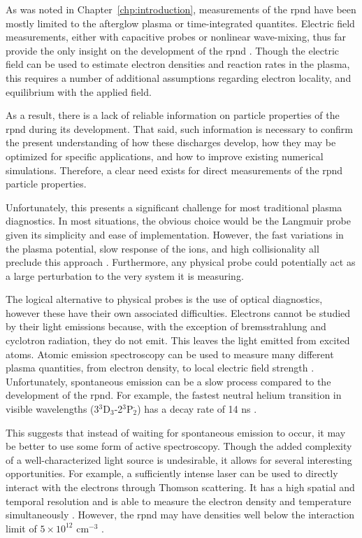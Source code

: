 As was noted in Chapter~\ref{chp:introduction}, measurements of the \acs{rpnd}
have been mostly limited to the afterglow plasma or time-integrated quantites.
Electric field measurements, either with capacitive probes or nonlinear
wave-mixing, thus far provide the only insight on the development of the
\acs{rpnd} \cite{Ito2010, Muller2011a, Takashima2011}. Though the electric field
can be used to estimate electron densities and reaction rates in the plasma,
this requires a number of additional assumptions regarding electron locality,
and equilibrium with the applied field.

As a result, there is a lack of reliable information on particle properties of
the \acs{rpnd} during its development. That said, such information is necessary
to confirm the present understanding of how these discharges develop, how they
may be optimized for specific applications, and how to improve existing
numerical simulations. Therefore, a clear need exists for direct measurements of
the \acs{rpnd} particle properties.

Unfortunately, this presents a significant challenge for most traditional plasma
diagnostics. In most situations, the obvious choice would be the Langmuir probe
given its simplicity and ease of implementation. However, the fast variations in
the plasma potential, slow response of the ions, and high collisionality all
preclude this approach \cite{Lieberman2005}. Furthermore, any physical probe
could potentially act as a large perturbation to the very system it is
measuring.

The logical alternative to physical probes is the use of optical diagnostics,
however these have their own associated difficulties. Electrons cannot be
studied by their light emissions because, with the exception of bremsstrahlung
and cyclotron radiation, they do not emit. This leaves the light emitted from
excited atoms. Atomic emission spectroscopy can be used to measure many
different plasma quantities, from electron density, to local electric field
strength \cite{Griem2005}. Unfortunately, spontaneous emission can be a slow
process compared to the development of the \acs{rpnd}. For example, the fastest
neutral helium transition in visible wavelengths (3$^3$D$_3$-2$^3$P$_2^\cdot$)
has a decay rate of 14 ns \cite{Kramida2012}.

This suggests that instead of waiting for spontaneous emission to occur, it may
be better to use some form of active spectroscopy. Though the added complexity
of a well-characterized light source is undesirable, it allows for several
interesting opportunities. For example, a sufficiently intense laser can be used
to directly interact with the electrons through Thomson scattering. It has a
high spatial and temporal resolution and is able to measure the electron density
and temperature simultaneously \cite{VanGessel2012}. However, the \acs{rpnd} may
have densities well below the interaction limit of $5\times10^{12}$ cm$^{-3}$
\cite{Pai2009}.


